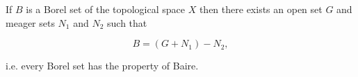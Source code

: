 If $B$ is a Borel set of the topological space $X$ then there exists an open set $G$ and meager sets $N_1$ and $N_2$ such that

$$B = (G + N_1) - N_2,$$

i.e. every Borel set has the property of Baire.
